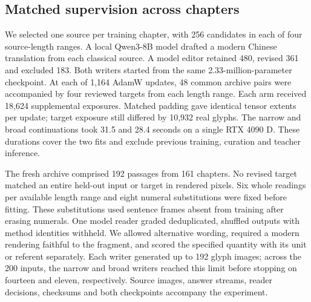 \subsection*{Matched supervision across chapters}
We selected one source per training chapter, with 256 candidates in each of four source-length ranges. A local Qwen3-8B model drafted a modern Chinese translation from each classical source. A model editor retained 480, revised 361 and excluded 183. Both writers started from the same 2.33-million-parameter checkpoint. At each of 1,164 AdamW updates, 48 common archive pairs were accompanied by four reviewed targets from each length range. Each arm received 18,624 supplemental exposures. Matched padding gave identical tensor extents per update; target exposure still differed by 10,932 real glyphs. The narrow and broad continuations took 31.5 and 28.4 seconds on a single RTX 4090 D. These durations cover the two fits and exclude previous training, curation and teacher inference.

The fresh archive comprised 192 passages from 161 chapters. No revised target matched an entire held-out input or target in rendered pixels. Six whole readings per available length range and eight numeral substitutions were fixed before fitting. These substitutions used sentence frames absent from training after erasing numerals. One model reader graded deduplicated, shuffled outputs with method identities withheld. We allowed alternative wording, required a modern rendering faithful to the fragment, and scored the specified quantity with its unit or referent separately. Each writer generated up to 192 glyph images; across the 200 inputs, the narrow and broad writers reached this limit before stopping on fourteen and eleven, respectively. Source images, answer streams, reader decisions, checksums and both checkpoints accompany the experiment.
